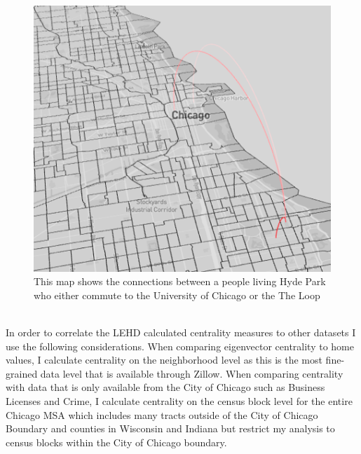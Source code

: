 \documentclass{article}
\theoremstyle{definition}
\theoremstyle{remark}
\begin{document}
\begin{figure}[H]
    \centering
    \includegraphics[width=1.0\textwidth]{arc-2}
    \caption{This map shows the connections between a people living Hyde Park who either commute to the University of Chicago or the The Loop}
    \label{fig:arc-2}
\end{figure} \\

In order to correlate the LEHD calculated centrality measures to other datasets I use the following considerations.  When comparing eigenvector centrality to home values, I calculate centrality on the neighborhood level as this is the most fine-grained data level that is available through Zillow.  When comparing centrality with data that is only available from the City of Chicago such as Business Licenses and Crime, I calculate centrality on the census block level for the entire Chicago MSA which includes many tracts outside of the City of Chicago Boundary and counties in Wisconsin and Indiana but restrict my analysis to census blocks within the City of Chicago boundary.
\end{document}

